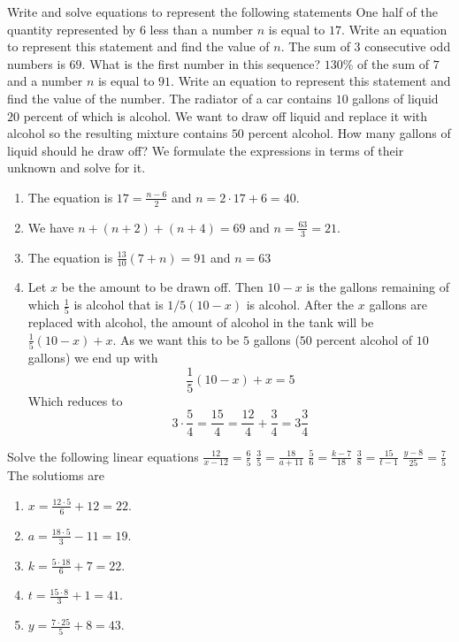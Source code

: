 \begin{ExerciseList}
\Exercise Write and solve equations to represent the following statements
\Question One half of the quantity represented by $6$ less than a number $n$ is equal to $17$. Write an equation to represent this statement and find the value of $n$.
\Question The sum of $3$ consecutive odd numbers is $69$. What is the first number in this sequence?
\Question $130\%$ of the sum of $7$ and a number $n$ is equal to $91$. Write an equation to represent this statement and find the value of the number.
\Question The radiator of a car contains $10$ gallons of liquid $20$ percent of which is alcohol. We want to draw off liquid and replace it with alcohol so the resulting mixture contains $50$ percent alcohol. How many gallons of liquid should he draw off?
\Answer We formulate the expressions in terms of their unknown and solve for it.
\begin{enumerate}
\item \myindent The equation is $17=\frac{n-6}{2}$ and $n = 2 \cdot 17 + 6 = 40$.
\item \myindent We have $n + (n+2) + (n+4) = 69$ and $n = \frac{63}{3} = 21$.
\item \myindent The equation is $\frac{13}{10}(7 + n) = 91$ and $n = 63$
\item \myindent Let $x$ be the amount to be drawn off. Then $10 - x$ is the gallons remaining of which $\frac{1}{5}$ is alcohol that is $1/5(10 - x)$ is alcohol. After the $x$ gallons are replaced with alcohol, the amount of alcohol in the tank will be $\frac{1}{5}(10 - x) + x$. As we want this to be $5$ gallons ($50$ percent alcohol of $10$ gallons) we end up with
\[
\frac{1}{5}(10 - x) + x = 5
\]
Which reduces to
\[
3 \cdot \frac{5}{4} = \frac{15}{4} = \frac{12}{4} + \frac{3}{4} = 3\frac{3}{4}
\]
\end{enumerate}

\Exercise Solve the following linear equations
\Question $\frac{12}{x-12} = \frac{6}{5}$
\Question $\frac{3}{5} = \frac{18}{a + 11}$
\Question $\frac{5}{6} = \frac{k-7}{18}$
\Question $\frac{3}{8} = \frac{15}{t-1}$
\Question $\frac{y-8}{25} = \frac{7}{5}$
\Answer The solutioms are
\begin{enumerate}
\item\myindent $x = \frac{12 \cdot 5}{6} + 12 = 22$.
\item\myindent $a = \frac{18 \cdot 5}{3} - 11 = 19$.
\item\myindent $k = \frac{5 \cdot 18}{6} + 7 = 22$.
\item\myindent $t = \frac{15 \cdot 8}{3} + 1 = 41$.
\item\myindent $y = \frac{7 \cdot 25}{5} + 8 = 43$.
\end{enumerate}


\end{ExerciseList}
